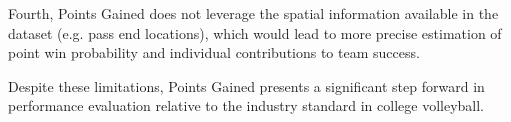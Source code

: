 \documentclass[USenglish]{article}
\theoremstyle{dgthm}
\theoremstyle{dgdef}
\begin{document}
Fourth, Points Gained does not leverage the spatial information available in the dataset (e.g. pass end locations), which would lead to more precise estimation of point win probability and individual contributions to team success.

Despite these limitations, Points Gained presents a significant step forward in performance evaluation relative to the industry standard in college volleyball.

\printbibliography
\end{document}
